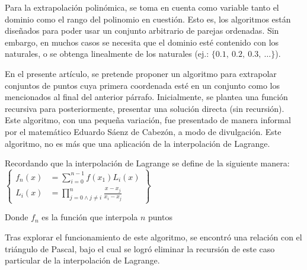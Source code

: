 
Para la extrapolación polinómica, se toma en cuenta como variable tanto el
dominio como el rango del polinomio en cuestión. Esto es, los algoritmos
están diseñados para poder usar un conjunto arbitrario de parejas ordenadas.
Sin embargo, en muchos casos se necesita que el dominio esté contenido con
los naturales, o se obtenga linealmente de los naturales
(ej.: $\{0.1,\ 0.2,\ 0.3,\ \dots\}$). 

En el presente artículo, se pretende proponer un algoritmo para extrapolar
conjuntos de puntos cuya primera coordenada esté en un conjunto como los
mencionados al final del anterior párrafo. Inicialmente, se plantea una
función recursiva para posteriormente, presentar una solución directa (sin recursión).\\
Este algoritmo, con una pequeña variación, fue presentado de manera informal
por el matemático Eduardo Sáenz de Cabezón, a modo de divulgación.
Este algoritmo, no es más que una aplicación de la interpolación de Lagrange.\\

\begin{center}
    Recordando que la interpolación de Lagrange se define de la siguiente manera:\\[20pt]
$
\left\{
\begin{aligned}
    f_n(x) &= \sum_{i=0}^{n-1}f(x_1)L_i(x)\\
    L_i(x) &= \prod_{j = 0 \land j \not= i}^{n} \frac{x - x_j}{x_i - x_j}
\end{aligned}
\right\}
$

    Donde $f_n$ es la función que interpola $n$ puntos
\end{center}

Tras explorar el funcionamiento de este algoritmo, se encontró una relación
con el triángulo de Pascal, bajo el cual se logró eliminar la recursión de
este caso particular de la interpolación de Lagrange. 